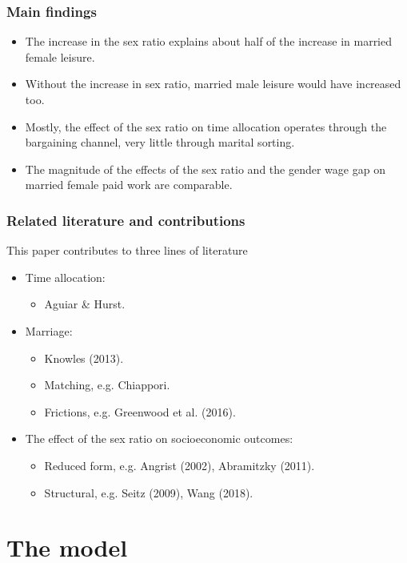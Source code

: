 \documentclass{beamer}
\begin{document}
\begin{frame}
	\frametitle{Main findings}\label{frame:main_findings}
	
	\begin{itemize}
		\item The increase in the sex ratio explains about half of the increase in married female leisure.
		\item Without the increase in sex ratio, married male leisure would have increased too. 
		\item Mostly, the effect of the sex ratio on time allocation operates through the bargaining channel, very little through marital sorting.
		\item The magnitude of the effects of the sex ratio and the gender wage gap on married female paid work are comparable.
	\end{itemize}
\end{frame}

\begin{frame}
	\frametitle{Related literature and contributions}
	This paper contributes to three lines of literature
	\begin{itemize}
		\item Time allocation:
		\begin{itemize}
			\item Aguiar \& Hurst.
		\end{itemize}
		\item Marriage:
		\begin{itemize}
			\item Knowles (2013).
			\item Matching, e.g. Chiappori.
			\item Frictions, e.g. Greenwood et al. (2016).
		\end{itemize}
		\item The effect of the sex ratio on socioeconomic outcomes:
		\begin{itemize}
			\item Reduced form, e.g. Angrist (2002), Abramitzky (2011).
			\item Structural, e.g. Seitz (2009), Wang (2018).
		\end{itemize}
	\end{itemize}
\end{frame}

\section{The model}
\end{document}
